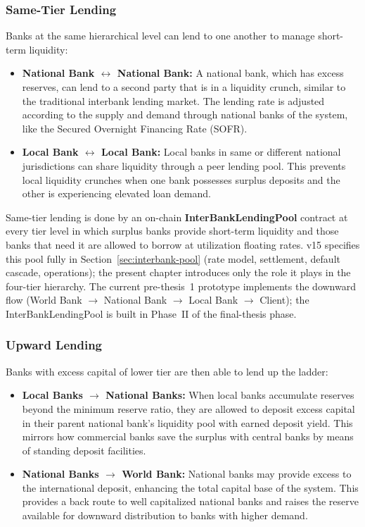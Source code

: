 \documentclass[12pt,a4paper]{report}
\begin{document}
\subsubsection{Same-Tier Lending}

Banks at the same hierarchical level can lend to one another to manage short-term liquidity:

\begin{itemize}[noitemsep]
\item \textbf{National Bank $\leftrightarrow$ National Bank:} A national bank, which has excess reserves, can lend to a second party that is in a liquidity crunch, similar to the traditional interbank lending market. The lending rate is adjusted according to the supply and demand through national banks of the system, like the Secured Overnight Financing Rate (SOFR).
\item \textbf{Local Bank $\leftrightarrow$ Local Bank:} Local banks in same or different national jurisdictions can share liquidity through a peer lending pool. This prevents local liquidity crunches when one bank possesses surplus deposits and the other is experiencing elevated loan demand.
\end{itemize}

Same-tier lending is done by an on-chain \textbf{InterBankLendingPool} contract at every tier level in which surplus banks provide short-term liquidity and those banks that need it are allowed to borrow at utilization floating rates. v15 specifies this pool fully in Section~\ref{sec:interbank-pool} (rate model, settlement, default cascade, operations); the present chapter introduces only the role it plays in the four-tier hierarchy. The current pre-thesis~1 prototype implements the downward flow (World Bank $\to$ National Bank $\to$ Local Bank $\to$ Client); the InterBankLendingPool is built in Phase~II of the final-thesis phase.

\subsubsection{Upward Lending}

Banks with excess capital of lower tier are then able to lend up the ladder:

\begin{itemize}[noitemsep]
\item \textbf{Local Banks $\to$ National Banks:} When local banks accumulate reserves beyond the minimum reserve ratio, they are allowed to deposit excess capital in their parent national bank's liquidity pool with earned deposit yield. This mirrors how commercial banks save the surplus with central banks by means of standing deposit facilities.
\item \textbf{National Banks $\to$ World Bank:} National banks may provide excess to the international deposit, enhancing the total capital base of the system. This provides a back route to well capitalized national banks and raises the reserve available for downward distribution to banks with higher demand.
\end{itemize}
\end{document}
